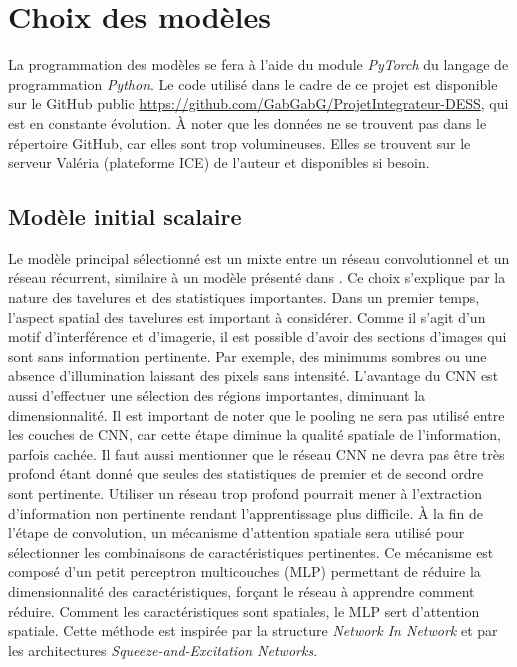 \documentclass[MSc,french]{ulthese}
\begin{document}
\chapter{Choix des modèles}
La programmation des modèles se fera à l'aide du module \textit{PyTorch} du langage de programmation \textit{Python}. Le code utilisé dans le cadre de ce projet est disponible sur le GitHub public \url{https://github.com/GabGabG/ProjetIntegrateur-DESS}, qui est en constante évolution. À noter que les données ne se trouvent pas dans le répertoire GitHub, car elles sont trop volumineuses. Elles se trouvent sur le serveur Valéria (plateforme ICE) de l'auteur et disponibles si besoin.
\section{Modèle initial scalaire}
Le modèle principal sélectionné est un mixte entre un réseau convolutionnel et un réseau récurrent, similaire à un modèle présenté dans \cite{kaler_deep_2023}. Ce choix s'explique par la nature des tavelures et des statistiques importantes. Dans un premier temps, l'aspect spatial des tavelures est important à considérer. Comme il s'agit d'un motif d'interférence et d'imagerie, il est possible d'avoir des sections d'images qui sont sans information pertinente. Par exemple, des minimums sombres ou une absence d'illumination laissant des pixels sans intensité. L'avantage du CNN est aussi d'effectuer une sélection des régions importantes, diminuant la dimensionnalité. Il est important de noter que le pooling ne sera pas utilisé entre les couches de CNN, car cette étape diminue la qualité spatiale de l'information, parfois cachée. Il faut aussi mentionner que le réseau CNN ne devra pas être très profond étant donné que seules des statistiques de premier et de second ordre sont pertinente. Utiliser un réseau trop profond pourrait mener à l'extraction d'information non pertinente rendant l'apprentissage plus difficile. À la fin de l'étape de convolution, un mécanisme d'attention spatiale sera utilisé pour sélectionner les combinaisons de caractéristiques pertinentes. Ce mécanisme est composé d’un petit perceptron multicouches (MLP) permettant de réduire la dimensionnalité des caractéristiques, forçant le réseau à apprendre comment réduire. Comment les caractéristiques sont spatiales, le MLP sert d'attention spatiale. Cette méthode est inspirée par la structure \textit{Network In Network}\cite{lin_network_2014} et par les architectures \textit{Squeeze-and-Excitation Networks}\cite{hu_squeeze-and-excitation_2017}.
\end{document}
